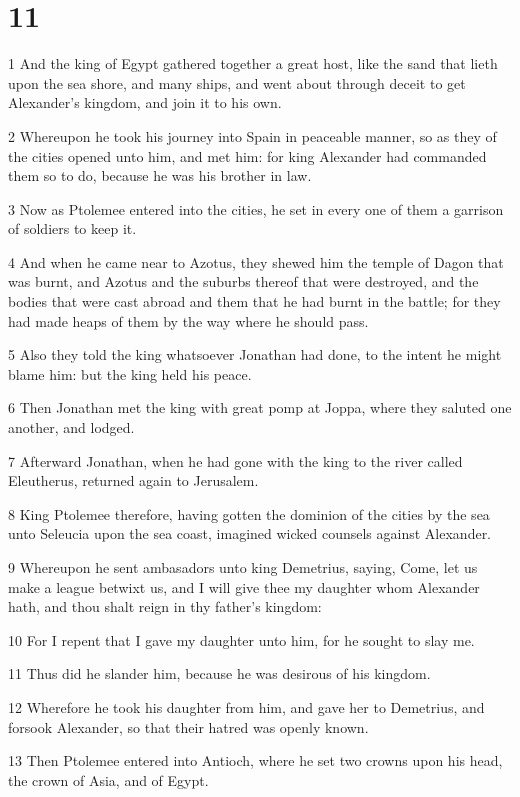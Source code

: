 \chapter{11}

\par 1 And the king of Egypt gathered together a great host, like the sand that lieth upon the sea shore, and many ships, and went about through deceit to get Alexander's kingdom, and join it to his own.
\par 2 Whereupon he took his journey into Spain in peaceable manner, so as they of the cities opened unto him, and met him: for king Alexander had commanded them so to do, because he was his brother in law.
\par 3 Now as Ptolemee entered into the cities, he set in every one of them a garrison of soldiers to keep it.
\par 4 And when he came near to Azotus, they shewed him the temple of Dagon that was burnt, and Azotus and the suburbs thereof that were destroyed, and the bodies that were cast abroad and them that he had burnt in the battle; for they had made heaps of them by the way where he should pass.
\par 5 Also they told the king whatsoever Jonathan had done, to the intent he might blame him: but the king held his peace.
\par 6 Then Jonathan met the king with great pomp at Joppa, where they saluted one another, and lodged.
\par 7 Afterward Jonathan, when he had gone with the king to the river called Eleutherus, returned again to Jerusalem.
\par 8 King Ptolemee therefore, having gotten the dominion of the cities by the sea unto Seleucia upon the sea coast, imagined wicked counsels against Alexander.
\par 9 Whereupon he sent ambasadors unto king Demetrius, saying, Come, let us make a league betwixt us, and I will give thee my daughter whom Alexander hath, and thou shalt reign in thy father's kingdom:
\par 10 For I repent that I gave my daughter unto him, for he sought to slay me.
\par 11 Thus did he slander him, because he was desirous of his kingdom.
\par 12 Wherefore he took his daughter from him, and gave her to Demetrius, and forsook Alexander, so that their hatred was openly known.
\par 13 Then Ptolemee entered into Antioch, where he set two crowns upon his head, the crown of Asia, and of Egypt.
